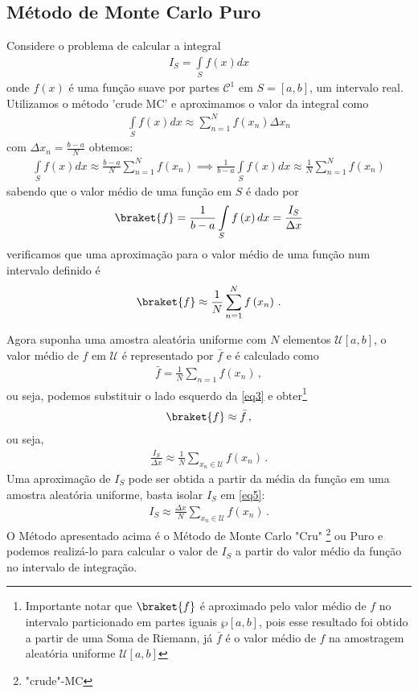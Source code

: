 \documentclass{article}
\begin{document}
\subsection{Método de Monte Carlo Puro}
Considere o problema de calcular a integral
\begin{align}
    I_S=\int\limits_{S}f(x)dx
\end{align}
onde $f(x)$ é uma função suave por partes $\mathcal{C}^1$ em $S=\left[a,b\right]$, um intervalo real. Utilizamos o método 'crude MC' e aproximamos o valor da integral como
\begin{align*}
        \int\limits_{S}f(x)dx\approx \sum_{n=1}^{N}f\left(x_n\right)\Delta x_n
\end{align*}
com $\Delta x_n=\frac{b-a}{N}$ obtemos:
\begin{align}\label{eq2}
    \int\limits_{S}f(x)dx\approx \frac{b-a}{N}\sum_{n=1}^{N}f\left(x_n\right)\implies \frac{1}{b-a}\int\limits_{S}f\left(x\right)dx\approx \frac{1}{N}\sum_{n=1}^{N}f\left(x_n\right)
\end{align}
sabendo que o valor médio de uma função em $S$ é dado por
\begin{align*}
    \braket{f}=\frac{1}{b-a}\int\limits_{S}f\left(x\right)dx=\frac{I_S}{\Delta x}
\end{align*}
verificamos que uma aproximação para o valor médio de uma função num intervalo definido é
\begin{align}\label{eq3}
    \braket{f}\approx \frac{1}{N}\sum_{n=1}^{N}f\left(x_n\right)\,.
\end{align}



Agora suponha uma amostra aleatória uniforme com $N$ elementos $\mathcal{U}[a,b]$, o valor médio de $f$ em $\mathcal{U}$ é representado por $\bar{f}$ e é calculado como
\begin{align}
    \bar{f}=\frac{1}{N}\sum_{n=1}f\left(x_n\right)\,,
\end{align}
ou seja, podemos substituir o lado esquerdo da \ref{eq3} e obter\footnote{Importante notar que $\braket{f}$ é aproximado pelo valor médio de $f$ no intervalo particionado em partes iguais $\wp[a,b]$, pois esse resultado foi obtido a partir de uma Soma de Riemann, já $\bar{f}$ é o valor médio de $f$ na amostragem aleatória uniforme $\mathcal{U}[a,b]$}
\begin{align*}
    \braket{f}\approx \bar{f}\,,
\end{align*}
ou seja,
\begin{align}\label{eq5}
    \frac{I_S}{\Delta x}\approx \frac{1}{N}\sum_{x_n\in \mathcal{U}}f\left(x_n\right)\,.
\end{align}
Uma aproximação de $I_S$ pode ser obtida a partir da média da função em uma amostra aleatória uniforme, basta isolar $I_S$ em \ref{eq5}:
\begin{align}
    I_S\approx \frac{\Delta x}{N}\sum_{x_n\in \mathcal{U}}f\left(x_n\right)\,.
\end{align}
O Método apresentado acima é o Método de Monte Carlo "Cru" \footnote{"crude"-MC} \cite{deb2014variational}
ou Puro e podemos realizá-lo para calcular o valor de $I_S$ a partir do valor médio da função no intervalo de integração.
\end{document}
